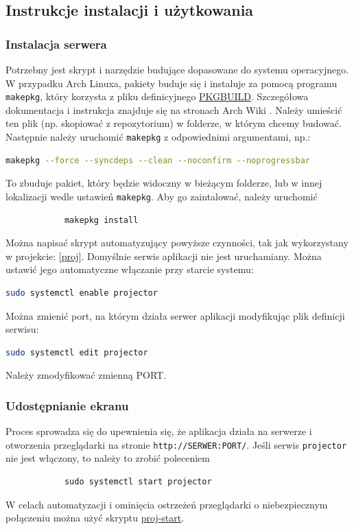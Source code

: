 \documentclass[a4paper,11pt]{article}
\begin{document}
        \subsection{Instrukcje instalacji i użytkowania}
            \subsubsection{Instalacja serwera}
            Potrzebny jest skrypt i narzędzie budujące dopasowane do systemu operacyjnego. 
            W przypadku Arch Linuxa, pakiety buduje się i instaluje za pomocą programu \texttt{makepkg}, który korzysta z pliku definicyjnego \hyperref[PKGBUILD]{PKGBUILD}.
            Szczegółowa dokumentacja i instrukcja znajduje się na stronach Arch Wiki \cite{4}.
            Należy umieścić ten plik (np. skopiować z repozytorium) w folderze, w którym chcemy budować.
            Następnie należy uruchomić \texttt{makepkg} z odpowiednimi argumentami, np.:
            \begin{lstlisting}[language=bash]
            makepkg --force --syncdeps --clean --noconfirm --noprogressbar
            \end{lstlisting}
            To zbuduje pakiet, który będzie widoczny w bieżącym folderze, lub w innej lokalizacji wedle ustawień \texttt{makepkg}.
            Aby go zaintalować, należy uruchomić
            \begin{lstlisting}
            makepkg install
            \end{lstlisting}
            Można napisać skrypt automatyzujący powyższe czynności, tak jak wykorzystany w projekcie: \ref{proj}.
            Domyślnie serwis aplikacji nie jest uruchamiany. Można ustawić jego automatyczne włączanie przy starcie systemu:
            \begin{lstlisting}[language=bash]
            sudo systemctl enable projector
            \end{lstlisting}
            Można zmienić port, na którym działa serwer aplikacji modyfikując plik definicji serwisu:
            \begin{lstlisting}[language=bash]
            sudo systemctl edit projector
            \end{lstlisting}
            Należy zmodyfikować zmienną PORT.
            \subsubsection{Udostępnianie ekranu}
            Proces sprowadza się do upewnienia się, że aplikacja działa na serwerze i otworzenia przeglądarki na stronie \texttt{http://SERWER:PORT/}.
            Jeśli serwis \texttt{projector} nie jest włączony, to należy to zrobić poleceniem
            \begin{lstlisting}
            sudo systemctl start projector
            \end{lstlisting}
            W celach automatyzacji i ominięcia ostrzeżeń przeglądarki o niebezpiecznym połączeniu można użyć skryptu \hyperref[proj-start]{proj-start}.
\end{document}
